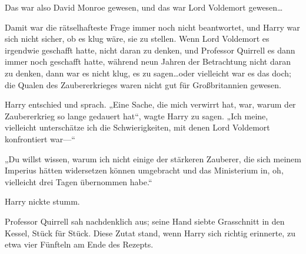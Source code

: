 Das war also David Monroe gewesen, und das war Lord Voldemort gewesen…

Damit war die rätselhafteste Frage immer noch nicht beantwortet, und Harry war sich nicht sicher, ob es klug wäre, sie zu stellen. Wenn Lord Voldemort es irgendwie geschafft hatte, nicht daran zu denken, und Professor Quirrell es dann immer noch geschafft hatte, während neun Jahren der Betrachtung nicht daran zu denken, dann war es nicht klug, es zu sagen…oder vielleicht war es das doch; die Qualen des Zaubererkrieges waren nicht gut für Großbritannien gewesen.

Harry entschied und sprach.
„Eine Sache, die mich verwirrt hat, war, warum der Zaubererkrieg so lange gedauert hat“, wagte Harry zu sagen. „Ich meine, vielleicht unterschätze ich die Schwierigkeiten, mit denen Lord Voldemort konfrontiert war—“

„Du willst wissen, warum ich nicht einige der stärkeren Zauberer, die sich meinem Imperius hätten widersetzen können umgebracht und das Ministerium in, oh, vielleicht drei Tagen übernommen habe.“

Harry nickte stumm.

Professor Quirrell sah nachdenklich aus; seine Hand siebte Grasschnitt in den Kessel, Stück für Stück. Diese Zutat stand, wenn Harry sich richtig erinnerte, zu etwa vier Fünfteln am Ende des Rezepts.

